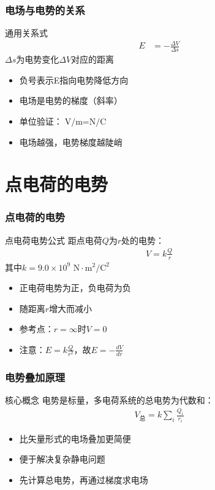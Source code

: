 \documentclass{beamer}
\begin{document}
\begin{frame}
    \frametitle{电场与电势的关系}
    
    \begin{block}{通用关系式}
        \begin{align}
            E &= -\frac{\Delta V}{\Delta s}
        \end{align}
        $\Delta s$为电势变化$\Delta V$对应的距离
    \end{block}
    
    \begin{itemize}
        \item 负号表示E指向电势降低方向
        \item 电场是电势的梯度（斜率）
        \item 单位验证：$\text{V/m} = \text{N/C}$
        \item 电场越强，电势梯度越陡峭
    \end{itemize}
\end{frame}

\section{点电荷的电势}

\begin{frame}
    \frametitle{点电荷的电势}
    
    \begin{block}{点电荷电势公式}
        距点电荷$Q$为$r$处的电势：
        \begin{align}
            V = k\frac{Q}{r}
        \end{align}
        其中$k = 9.0 \times 10^9 \text{ N}\cdot\text{m}^2/\text{C}^2$
    \end{block}
    
    \begin{itemize}
        \item 正电荷电势为正，负电荷为负
        \item 随距离$r$增大而减小
        \item 参考点：$r=\infty$时$V=0$
        \item 注意：$E = k\frac{Q}{r^2}$，故$E = -\frac{dV}{dr}$
    \end{itemize}
\end{frame}

\begin{frame}
    \frametitle{电势叠加原理}
    
    \begin{block}{核心概念}
        电势是标量，多电荷系统的总电势为代数和：
        \begin{align}
            V_{总} = k\sum_i \frac{Q_i}{r_i}
        \end{align}
    \end{block}
    
    \begin{itemize}
        \item 比矢量形式的电场叠加更简便
        \item 便于解决复杂静电问题
        \item 先计算总电势，再通过梯度求电场
    \end{itemize}
\end{frame}
\end{document}
